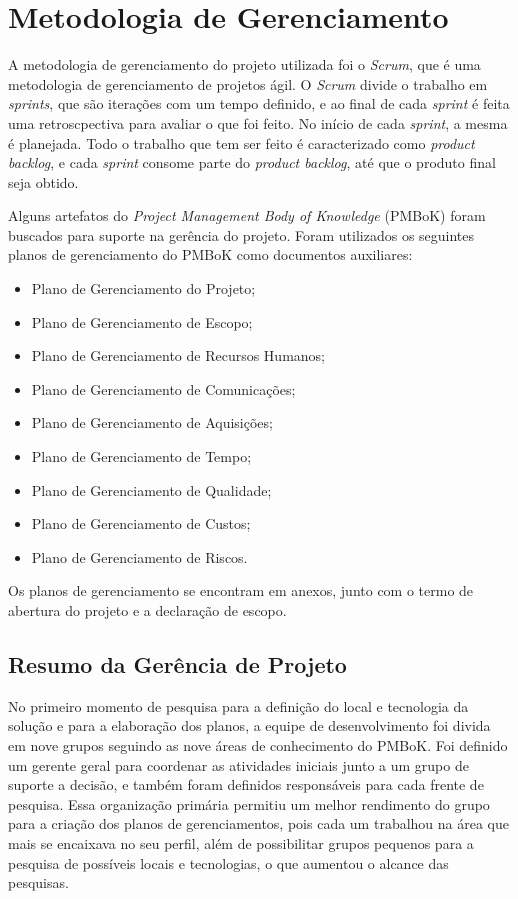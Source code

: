  
\section{Metodologia de Gerenciamento}

A metodologia de gerenciamento do projeto utilizada foi o \textit{Scrum}, que é uma metodologia de gerenciamento de projetos ágil.
O \textit{Scrum} divide o trabalho em \textit{sprints}, que são iterações com um tempo definido, e ao final de cada 
\textit{sprint} é feita uma retroscpectiva para avaliar o que foi feito. No início de cada \textit{sprint},
a mesma é planejada. Todo o trabalho que tem ser feito é caracterizado como \textit{product backlog}, e cada \textit{sprint}
consome parte do \textit{product backlog}, até que o produto final seja obtido.

Alguns artefatos do \textit{Project Management Body of Knowledge} (PMBoK) foram buscados para suporte na gerência do projeto.
Foram utilizados os seguintes planos de gerenciamento do PMBoK como documentos auxiliares:

  \begin{itemize}
  \item Plano de Gerenciamento do Projeto;
  \item Plano de Gerenciamento de Escopo;
  \item Plano de Gerenciamento de Recursos Humanos;
  \item Plano de Gerenciamento de Comunicações;
  \item Plano de Gerenciamento de Aquisições;
  \item Plano de Gerenciamento de Tempo;
  \item Plano de Gerenciamento de Qualidade;
  \item Plano de Gerenciamento de Custos;
  \item Plano de Gerenciamento de Riscos.
  \end{itemize}
  
  Os planos de gerenciamento se encontram em anexos, junto com o termo de abertura do projeto e a declaração de escopo.
  
  \subsection{Resumo da Gerência de Projeto}
  
      No primeiro momento de pesquisa para a definição do local e tecnologia da solução e para a elaboração dos planos,
      a equipe de desenvolvimento foi divida em nove grupos seguindo as nove áreas de conhecimento do PMBoK.
      Foi definido um gerente geral para coordenar as atividades iniciais junto a um grupo de suporte a decisão, 
      e também foram definidos responsáveis para cada frente de pesquisa.
      Essa organização primária permitiu um melhor rendimento do grupo para a criação dos planos de gerenciamentos, pois cada
      um trabalhou na área que mais se encaixava no seu perfil, além de possibilitar grupos pequenos para a pesquisa de possíveis
      locais e tecnologias, o que aumentou o alcance das pesquisas.
      
